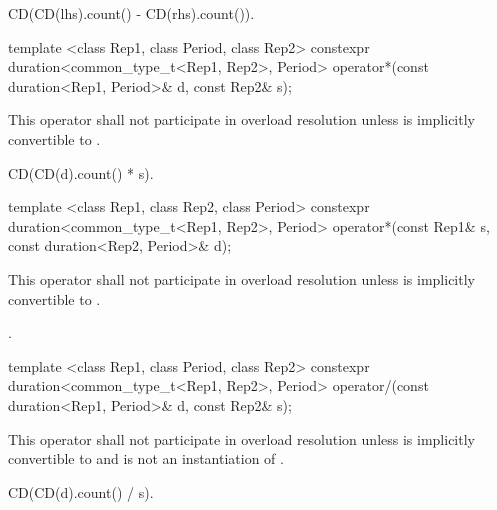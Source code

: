 \begin{itemdescr}
\pnum
\returns CD(CD(lhs).count() - CD(rhs).count()).
\end{itemdescr}

%
%
\begin{itemdecl}
template <class Rep1, class Period, class Rep2>
  constexpr duration<common_type_t<Rep1, Rep2>, Period>
  operator*(const duration<Rep1, Period>& d, const Rep2& s);
\end{itemdecl}

\begin{itemdescr}
\pnum
\remarks This operator shall not participate in overload
resolution unless  is implicitly convertible to .

\pnum
\returns CD(CD(d).count() * s).
\end{itemdescr}

%
%
\begin{itemdecl}
template <class Rep1, class Rep2, class Period>
  constexpr duration<common_type_t<Rep1, Rep2>, Period>
  operator*(const Rep1& s, const duration<Rep2, Period>& d);
\end{itemdecl}

\begin{itemdescr}
\pnum
\remarks This operator shall not participate in overload
resolution unless  is implicitly convertible to .

\pnum
\returns {}.
\end{itemdescr}

%
%
\begin{itemdecl}
template <class Rep1, class Period, class Rep2>
  constexpr duration<common_type_t<Rep1, Rep2>, Period>
  operator/(const duration<Rep1, Period>& d, const Rep2& s);
\end{itemdecl}

\begin{itemdescr}
\pnum
\remarks This operator shall not participate in overload
resolution unless  is implicitly convertible to 
and  is not an instantiation of .

\pnum
\returns CD(CD(d).count() / s).
\end{itemdescr}

